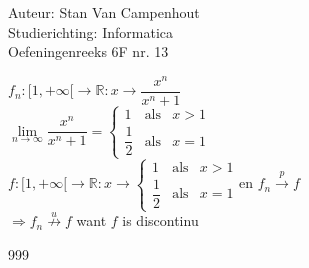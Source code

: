 \documentclass[a4paper]{article}
\begin{document}
  
\noindent \large Auteur: Stan Van Campenhout \\
\noindent \large Studierichting:  Informatica\\
\noindent \large Oefeningenreeks 6F nr. 13\\

\medskip

\normalsize

$ f_n : [1, +\infty[ \rightarrow \mathbb{R}  : x \rightarrow \dfrac{x^n}{x^n + 1} $\\

$ \lim\limits_{n \rightarrow \infty}\dfrac{x^n}{x^n + 1} = 
\left\{
\begin{array}{lll}
1 & \text{als} & x > 1 \\
\dfrac{1}{2} & \text{als} & x = 1
\end{array}
\right.$\\

$ f : [1, +\infty[ \rightarrow \mathbb{R} : x \rightarrow 
\left\{
\begin{array}{lll}
1 & \text{als} & x > 1 \\
\dfrac{1}{2} & \text{als} & x = 1
\end{array}
\right. \text{en } f_n \stackrel{p}{\rightarrow} f $\\

$ \Rightarrow f_n \stackrel{u}{\not\rightarrow} f $ want $f$ is discontinu \\

\begin{thebibliography}{999}
\end{thebibliography}
\end{document}
